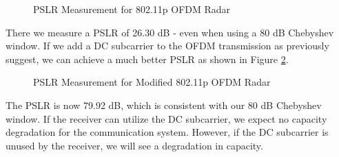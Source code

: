 \documentclass[conference]{IEEEtran}
\begin{document}
\begin{figure}[H]
\centering
{}
\caption{PSLR Measurement for 802.11p OFDM Radar}
\label{fig::pslr_802_11p_ofdm_radar}
\end{figure}

There we measure a PSLR of 26.30 dB - even when using a 80 dB Chebyshev window. If we add a DC subcarrier to the OFDM transmission as previously suggest, we can achieve a much better PSLR as shown in Figure \ref{fig::pslr_802_11p_mod_ofdm_radar}.

\begin{figure}[H]
\centering
{}
\caption{PSLR Measurement for Modified 802.11p OFDM Radar}
\label{fig::pslr_802_11p_mod_ofdm_radar}
\end{figure}

The PSLR is now 79.92 dB, which is consistent with our 80 dB Chebyshev window. If the receiver can utilize the DC subcarrier, we expect no capacity degradation for the communication system. However, if the DC subcarrier is unused by the receiver, we will see a degradation in capacity.
\end{document}
